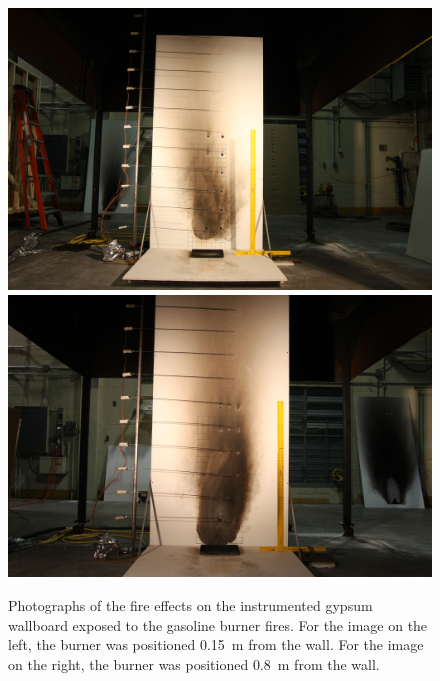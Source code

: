 \documentclass[twoside]{uocthesis}
\begin{document}
{\begin{figure}[p]
	\centering
	\includegraphics[trim=18.0in 4.0in 21.0in 14.0in, clip=true, width=0.4\columnwidth]{../Figures/IWGB_Gas_0_15_pattern}
	\includegraphics[trim=18.0in 2.6in 18.0in 11.7in, clip=true, width=0.4\columnwidth]{../Figures/IWGB_Gas7_0_8m} \\
	\caption[Photographs of the fire effects on the instrumented gypsum wallboard exposed to the gasoline burner fires]{Photographs of the fire effects on the instrumented gypsum wallboard exposed to the gasoline burner fires. For the image on the left, the burner was positioned 0.15~m from the wall.  For the image on the right, the burner was positioned 0.8~m from the wall.}
	\label{IWGB_Gas_patterns}
\end{figure}

}
\end{document}
